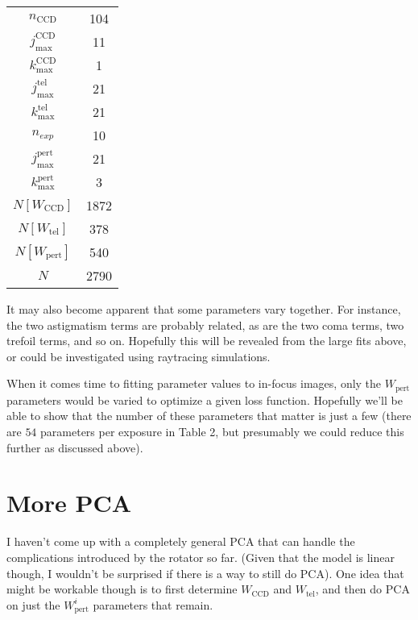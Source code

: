 \documentclass{article}
\begin{document}
\begin{table}[h]
    \center
    \label{tab:1}
    \begin{tabular}{c|c}
        \hline
        $n_\mathrm{CCD}$ & 104 \\
        $j^\mathrm{CCD}_\mathrm{max}$ & 11 \\
        $k^\mathrm{CCD}_\mathrm{max}$ & 1 \\
        $j^\mathrm{tel}_\mathrm{max}$ & 21 \\
        $k^\mathrm{tel}_\mathrm{max}$ & 21 \\
        $n_{exp}$ & 10 \\
        $j^\mathrm{pert}_\mathrm{max}$ & 21 \\
        $k^\mathrm{pert}_\mathrm{max}$ & 3 \\
        \hline
        $N[W_\mathrm{CCD}]$ & 1872 \\
        $N[W_\mathrm{tel}]$ & 378 \\
        $N[W_\mathrm{pert}]$ & 540 \\
        \hline
        $N$ & 2790
    \end{tabular}
\end{table}

It may also become apparent that some parameters vary together.  For instance, the two astigmatism
terms are probably related, as are the two coma terms, two trefoil terms, and so on.  Hopefully this
will be revealed from the large fits above, or could be investigated using raytracing simulations.

When it comes time to fitting parameter values to in-focus images, only the $W_\mathrm{pert}$
parameters would be varied to optimize a given loss function.  Hopefully we'll be able to show that
the number of these parameters that matter is just a few (there are $54$ parameters per exposure in
Table 2, but presumably we could reduce this further as discussed above).

\section{More PCA}

I haven't come up with a completely general PCA that can handle the complications introduced by the
rotator so far.  (Given that the model is linear though, I wouldn't be surprised if there is a way
to still do PCA).  One idea that might be workable though is to first determine $W_\mathrm{CCD}$ and
$W_\mathrm{tel}$, and then do PCA on just the $W^i_\mathrm{pert}$ parameters that remain.
\end{document}
